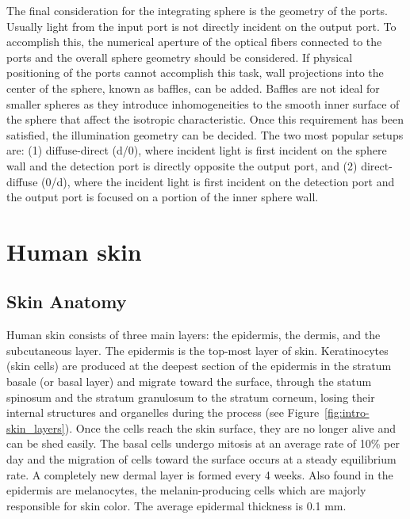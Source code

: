 The final consideration for the integrating sphere is the geometry of the ports. Usually light from the input port is not directly incident on the output port. To accomplish this, the numerical aperture of the optical fibers connected to the ports and the overall sphere geometry should be considered. If physical positioning of the ports cannot accomplish this task,  wall projections into the center of the sphere, known as baffles, can be added. Baffles are not ideal for smaller spheres as they introduce inhomogeneities to the smooth inner surface of the sphere that affect the isotropic characteristic. Once this requirement has been satisfied, the illumination geometry can be decided. The two most popular setups are: (1) diffuse-direct (d/0\degree), where incident light is first incident on the sphere wall and the detection port is directly opposite the output port, and (2) direct-diffuse (0\degree/d), where the incident light is first incident on the detection port and the output port is focused on a portion of the inner sphere wall.\cite{Springsteen1998}

\section{Human skin}
\label{sec:skin}

\subsection{Skin Anatomy}
Human skin consists of three main layers: the epidermis, the dermis, and the subcutaneous layer.\cite{Fodor2011a} The epidermis is the top-most layer of skin. Keratinocytes (skin cells) are produced at the deepest section of the epidermis in the stratum basale (or basal layer) and migrate toward the surface, through the statum spinosum and the stratum granulosum to the stratum corneum, losing their internal structures and organelles during the process (see Figure~\ref{fig:intro-skin_layers}). Once the cells reach the skin surface, they are no longer alive and can be shed easily. The basal cells undergo mitosis at an average rate of 10\% per day\cite{McQuestion2006} and the migration of cells toward the surface occurs at a steady equilibrium rate. A completely new dermal layer is formed every 4 weeks. Also found in the epidermis are melanocytes, the melanin-producing cells which are majorly responsible for skin color. The average epidermal thickness is 0.1 mm.\cite{Yang2009}

